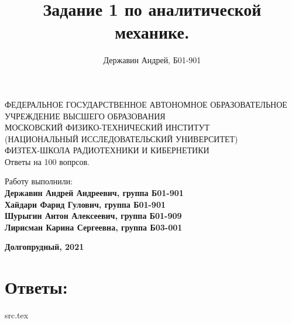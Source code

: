 \documentclass[15pt,a4paper,reqno]{article}
\title{Задание 1 по аналитической механике.}
\author{Державин Андрей, Б01-901}
\date{}
\begin{document}
\begin{center}
  \hfill \break
  \hfill \break
  {\small ФЕДЕРАЛЬНОЕ ГОСУДАРСТВЕННОЕ АВТОНОМНОЕ ОБРАЗОВАТЕЛЬНОЕ\\ УЧРЕЖДЕНИЕ ВЫСШЕГО ОБРАЗОВАНИЯ\\ МОСКОВСКИЙ ФИЗИКО-ТЕХНИЧЕСКИЙ ИНСТИТУТ\\ (НАЦИОНАЛЬНЫЙ ИССЛЕДОВАТЕЛЬСКИЙ УНИВЕРСИТЕТ)\\ ФИЗТЕХ-ШКОЛА РАДИОТЕХНИКИ И КИБЕРНЕТИКИ}\\
  \hfill \break
  \hfill \break
  \hfill \break
  \hfill \break
  \hfill \break
  \hfill \break
  \Huge{Ответы на 100 вопрсов.}\\
\end{center}
\hfill \break
\hfill \break
\hfill \break
\hfill \break
\hfill \break
\hfill \break
\hfill \break
\hfill \break

\hfill \break
\hfill \break
\hfill \break
\hfill \break
\hfill \break
\hfill \break

\begin{flushright}
  \normalsize{Работу выполнили:}\\
  \normalsize{\textbf{Державин Андрей Андреевич, группа Б01-901}}\\
  \normalsize{\textbf{Хайдари Фарид Гулович, группа Б01-901}}\\
  \normalsize{\textbf{Шурыгин Антон Алексеевич, группа Б01-909}}\\
  \normalsize{\textbf{Лирисман Карина Сергеевна, группа Б03-001}}
\end{flushright}

\begin{center}
  \normalsize{\textbf{Долгопрудный, 2021}}
\end{center}


\thispagestyle{empty} %


\newpage
\thispagestyle{plain}
\tableofcontents
\thispagestyle{plain}
\newpage


\section{Ответы:}
{src.tex}
\end{document}
